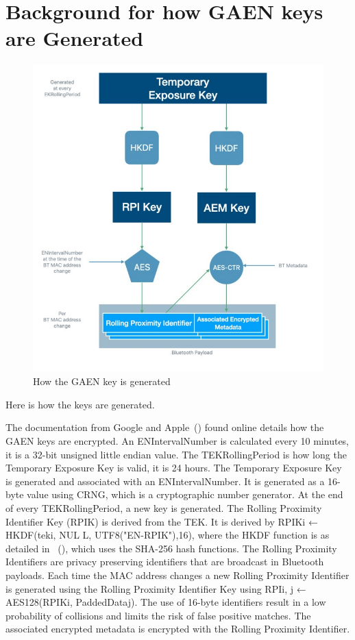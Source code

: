 \section{Background for how GAEN keys are Generated}
\label{sec:BackgroundGAENKeysGeneration}
\begin{figure}
    \includegraphics[width=\linewidth]{generatedKEY.jpg}
    \caption{How the GAEN key is generated}
    \label{fig:keyGeneration}
\end{figure}

Here is how the keys are generated. 

The documentation from Google and Apple~(\cite{appleCrypto}) found online details how the GAEN keys are encrypted. An ENIntervalNumber is calculated every 10 minutes, it is a 32-bit unsigned little endian value. The TEKRollingPeriod is how long the Temporary Exposure Key is valid, it is 24 hours. The Temporary Exposure Key is generated and associated with an ENIntervalNumber. It is generated as a 16-byte value using CRNG, which is a cryptographic number generator. At the end of every TEKRollingPeriod, a new key is generated. The Rolling Proximity Identifier Key (RPIK) is derived from the TEK. It is derived by RPIKi ← HKDF(teki, NUL L, UTF8("EN-RPIK"),16), where the HKDF function is as detailed in ~(\cite{rfc5869}), which uses the SHA-256 hash functions. The Rolling Proximity Identifiers are privacy preserving identifiers that are broadcast in Bluetooth payloads. Each time the MAC address changes a new Rolling Proximity Identifier is generated using the Rolling Proximity Identifier Key using RPIi, j ← AES128(RPIKi, PaddedDataj). The use of 16-byte identifiers result in a low probability of collisions and limits the risk of false positive matches. The associated encrypted metadata is encrypted with the Rolling Proximity Identifier. 


